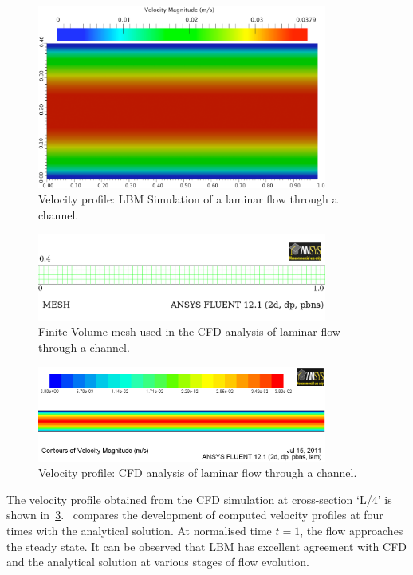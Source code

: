 \begin{figure}[htbp]
	\centering
	\includegraphics[width=0.85\textwidth]{LBM_Poiseuille}
	\caption{Velocity profile: LBM Simulation of a laminar flow through a 
		channel.}
	\label{fig:LBMcontour}
\end{figure}
%
\begin{figure}[htbp]
	\centering
	\includegraphics[width=0.85\textwidth]{CFD_Mesh}
	\caption{Finite Volume mesh used in the CFD analysis of laminar flow 
	through a 
		channel.}
	\label{fig:CFDmesh}
\end{figure}
%
\begin{figure}[htbp]
	\centering
	\includegraphics[width=0.85\textwidth]{CFD_Poiseuille}
	\caption{Velocity profile: CFD analysis of laminar flow through a channel.}
	\label{fig:CFDcontour}
\end{figure}

The velocity profile obtained from the CFD simulation at cross-section `L/4' is 
shown in~\cref{fig:CFDcontour}.~ compares the development of 
computed velocity profiles at four times with the analytical solution. At 
normalised time $t = 1$, the flow approaches the steady state. It can be 
observed that LBM has excellent agreement with CFD and the analytical solution 
at various stages of flow evolution.

